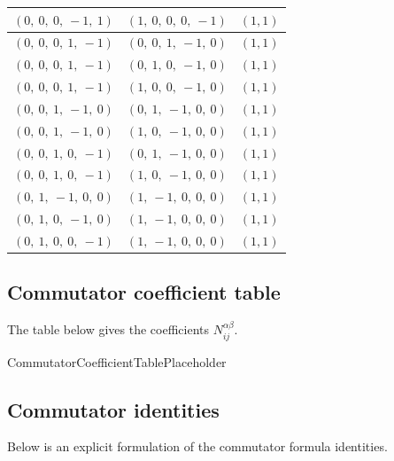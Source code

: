 \documentclass[11pt]{article}
\newcommand{\noi}{\noindent}
\theoremstyle{definition}
\begin{document}
\begin{tabular}{|l|l|c|}
    \hline
    $\left( 0, \  0, \  0, \  -1, \  1\right)$ & $\left( 1, \  0, \  0, \  0, \  -1\right)$ & $(1,1)$ \\
    \hline
    $\left( 0, \  0, \  0, \  1, \  -1\right)$ & $\left( 0, \  0, \  1, \  -1, \  0\right)$ & $(1,1)$ \\
    \hline
    $\left( 0, \  0, \  0, \  1, \  -1\right)$ & $\left( 0, \  1, \  0, \  -1, \  0\right)$ & $(1,1)$ \\
    \hline
    $\left( 0, \  0, \  0, \  1, \  -1\right)$ & $\left( 1, \  0, \  0, \  -1, \  0\right)$ & $(1,1)$ \\
    \hline
    $\left( 0, \  0, \  1, \  -1, \  0\right)$ & $\left( 0, \  1, \  -1, \  0, \  0\right)$ & $(1,1)$ \\
    \hline
    $\left( 0, \  0, \  1, \  -1, \  0\right)$ & $\left( 1, \  0, \  -1, \  0, \  0\right)$ & $(1,1)$ \\
    \hline
    $\left( 0, \  0, \  1, \  0, \  -1\right)$ & $\left( 0, \  1, \  -1, \  0, \  0\right)$ & $(1,1)$ \\
    \hline
    $\left( 0, \  0, \  1, \  0, \  -1\right)$ & $\left( 1, \  0, \  -1, \  0, \  0\right)$ & $(1,1)$ \\
    \hline
    $\left( 0, \  1, \  -1, \  0, \  0\right)$ & $\left( 1, \  -1, \  0, \  0, \  0\right)$ & $(1,1)$ \\
    \hline
    $\left( 0, \  1, \  0, \  -1, \  0\right)$ & $\left( 1, \  -1, \  0, \  0, \  0\right)$ & $(1,1)$ \\
    \hline
    $\left( 0, \  1, \  0, \  0, \  -1\right)$ & $\left( 1, \  -1, \  0, \  0, \  0\right)$ & $(1,1)$ \\
    \hline
\end{tabular}


\subsection{Commutator coefficient table}

\noi The table below gives the coefficients $N_{ij}^{\alpha\beta}$.

CommutatorCoefficientTablePlaceholder

\subsection{Commutator identities}

\noi Below is an explicit formulation of the commutator formula identities.
\end{document}
